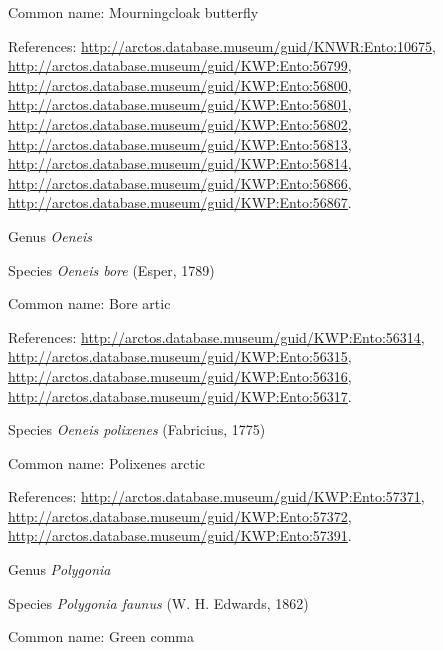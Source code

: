 \documentclass[9pt, article]{memoir}
\begin{document}
\begin{multicols}{2}
Common name: Mourningcloak butterfly

References: 
\url{http://arctos.database.museum/guid/KNWR:Ento:10675}, 
\url{http://arctos.database.museum/guid/KWP:Ento:56799}, 
\url{http://arctos.database.museum/guid/KWP:Ento:56800}, 
\url{http://arctos.database.museum/guid/KWP:Ento:56801}, 
\url{http://arctos.database.museum/guid/KWP:Ento:56802}, 
\url{http://arctos.database.museum/guid/KWP:Ento:56813}, 
\url{http://arctos.database.museum/guid/KWP:Ento:56814}, 
\url{http://arctos.database.museum/guid/KWP:Ento:56866}, 
\url{http://arctos.database.museum/guid/KWP:Ento:56867}.

\vspace{6pt}\noindent\hspace{30pt}Genus \textit{Oeneis}


\vspace{6pt}\noindent\hspace{36pt}Species \textit{Oeneis bore} (Esper, 1789)


Common name: Bore artic

References: 
\url{http://arctos.database.museum/guid/KWP:Ento:56314}, 
\url{http://arctos.database.museum/guid/KWP:Ento:56315}, 
\url{http://arctos.database.museum/guid/KWP:Ento:56316}, 
\url{http://arctos.database.museum/guid/KWP:Ento:56317}.

\vspace{6pt}\noindent\hspace{36pt}Species \textit{Oeneis polixenes} (Fabricius, 1775)


Common name: Polixenes arctic

References: 
\url{http://arctos.database.museum/guid/KWP:Ento:57371}, 
\url{http://arctos.database.museum/guid/KWP:Ento:57372}, 
\url{http://arctos.database.museum/guid/KWP:Ento:57391}.

\vspace{6pt}\noindent\hspace{30pt}Genus \textit{Polygonia}


\vspace{6pt}\noindent\hspace{36pt}Species \textit{Polygonia faunus} (W. H. Edwards, 1862)


Common name: Green comma


\end{multicols}
\end{document}
